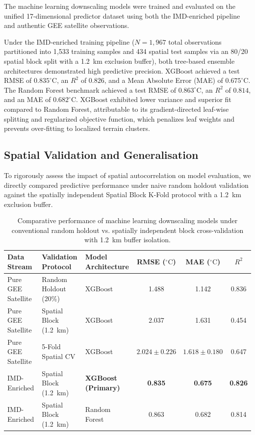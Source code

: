 \documentclass[a4paper,fleqn]{cas-sc}
\begin{document}
The machine learning downscaling models were trained and evaluated on the unified 17-dimensional predictor dataset using both the IMD-enriched pipeline and authentic GEE satellite observations.

Under the IMD-enriched training pipeline ($N = 1,967$ total observations partitioned into 1,533 training samples and 434 spatial test samples via an 80/20 spatial block split with a 1.2~km exclusion buffer), both tree-based ensemble architectures demonstrated high predictive precision. XGBoost achieved a test RMSE of $0.835^\circ\text{C}$, an $R^2$ of $0.826$, and a Mean Absolute Error (MAE) of $0.675^\circ\text{C}$. The Random Forest benchmark achieved a test RMSE of $0.863^\circ\text{C}$, an $R^2$ of $0.814$, and an MAE of $0.682^\circ\text{C}$. XGBoost exhibited lower variance and superior fit compared to Random Forest, attributable to its gradient-directed leaf-wise splitting and regularized objective function, which penalizes leaf weights and prevents over-fitting to localized terrain clusters.

\subsection{Spatial Validation and Generalisation}
\label{subsec:generalisation_results}

To rigorously assess the impact of spatial autocorrelation on model evaluation, we directly compared predictive performance under naive random holdout validation against the spatially independent Spatial Block K-Fold protocol with a 1.2~km exclusion buffer.

\begin{table}
\caption{Comparative performance of machine learning downscaling models under conventional random holdout vs. spatially independent block cross-validation with 1.2~km buffer isolation.}
\label{tab:validation_comparison}
\footnotesize
\begin{tabular*}{\linewidth}{@{\extracolsep{\fill}}lllccc@{}}
\toprule
Data Stream & Validation Protocol & Model Architecture & RMSE ($^\circ\text{C}$) & MAE ($^\circ\text{C}$) & $R^2$ \\
\midrule
Pure GEE Satellite & Random Holdout (20\%) & XGBoost & 1.488 & 1.142 & 0.836 \\
Pure GEE Satellite & Spatial Block (1.2~km) & XGBoost & 2.037 & 1.631 & 0.454 \\
Pure GEE Satellite & 5-Fold Spatial CV & XGBoost & $2.024 \pm 0.226$ & $1.618 \pm 0.180$ & 0.647 \\
\midrule
IMD-Enriched & Spatial Block (1.2~km) & \textbf{XGBoost (Primary)} & \textbf{0.835} & \textbf{0.675} & \textbf{0.826} \\
IMD-Enriched & Spatial Block (1.2~km) & Random Forest & 0.863 & 0.682 & 0.814 \\
\bottomrule
\end{tabular*}
\end{table}
\end{document}
